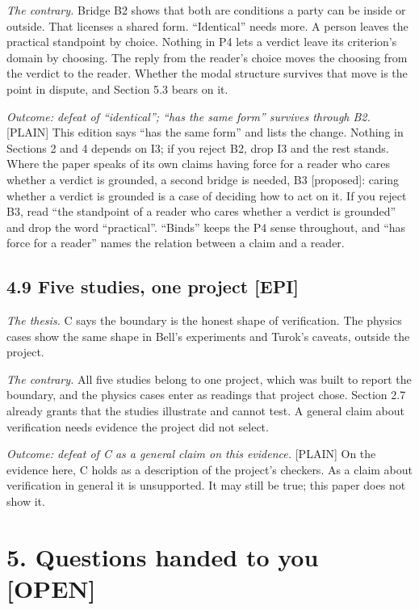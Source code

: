 \documentclass[11pt]{article}
\newcommand{\register}[1]{{\ttfamily\small #1}}
\begin{document}
\emph{The contrary.} Bridge B2 shows that both are conditions a party can be inside or outside. That licenses a shared form. ``Identical'' needs more. A person leaves the practical standpoint by choice. Nothing in P4 lets a verdict leave its criterion's domain by choosing. The reply from the reader's choice moves the choosing from the verdict to the reader. Whether the modal structure survives that move is the point in dispute, and Section 5.3 bears on it.

\emph{Outcome: defeat of ``identical''; ``has the same form'' survives through B2.} \register{[PLAIN]} This edition says ``has the same form'' and lists the change. Nothing in Sections 2 and 4 depends on I3; if you reject B2, drop I3 and the rest stands. Where the paper speaks of its own claims having force for a reader who cares whether a verdict is grounded, a second bridge is needed, B3 [proposed]: caring whether a verdict is grounded is a case of deciding how to act on it. If you reject B3, read ``the standpoint of a reader who cares whether a verdict is grounded'' and drop the word ``practical''. ``Binds'' keeps the P4 sense throughout, and ``has force for a reader'' names the relation between a claim and a reader.

\subsection*{4.9 Five studies, one project [EPI]}

\emph{The thesis.} C says the boundary is the honest shape of verification. The physics cases show the same shape in Bell's experiments and Turok's caveats, outside the project.

\emph{The contrary.} All five studies belong to one project, which was built to report the boundary, and the physics cases enter as readings that project chose. Section 2.7 already grants that the studies illustrate and cannot test. A general claim about verification needs evidence the project did not select.

\emph{Outcome: defeat of C as a general claim on this evidence.} \register{[PLAIN]} On the evidence here, C holds as a description of the project's checkers. As a claim about verification in general it is unsupported. It may still be true; this paper does not show it.

\section*{5. Questions handed to you \register{[OPEN]}}
\end{document}
